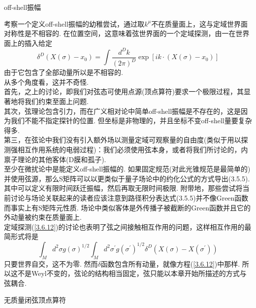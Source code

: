 \centerline{\Large off-shell振幅}
考察一个定义off-shell振幅的幼稚尝试，通过取$k^\mu$不在质量面上，这与定域世界面对称性是不相容的. 在位置空间，这意味着弦世界面的一个定域探测，由一在世界面上的插入给定
\begin{equation}\label{3.6.12}
\delta^{D}\left(X(\sigma)-x_{0}\right)=\int \frac{d^{D} k}{(2 \pi)^{D}} \exp \left[i k \cdot\left(X(\sigma)-x_{0}\right)\right]
\end{equation}
由于它包含了全部动量所以是不相容的.\\
从多个角度看，这并不奇怪. \\
首先，之上的讨论，即我们对弦态可使用点源(顶点算符)要求一个极限过程，其显著地将我们约束至面上问题. \\
其次，弦理论包含引力，而在广义相对论中简单off-shell振幅是不存在的，这是因为我们不能不指定探针的位置. 但坐标是非物理的，并且坐标不变off-shell量要复杂得多.\\
第三，在弦论中我们没有引入额外场以测量定域可观察量的自由度(类似于用以探测强相互作用系统的电弱过程)：我们必须使用弦本身，或者将我们所讨论的，内禀子理论的其他客体(D膜和孤子).\\
至少在微扰论中是能定义off-shell振幅的. 如果固定规范(对此光锥规范是最简单的)并使用弦源，那么S矩阵可以以更类似于量子场论中的约化公式的方式导出(3.5.5). 其中可以定义有限时间跃迁振幅，然后再取无限时间极限. 附带地，那些尝试将当前讨论与场论关联起来的读者应该注意到路径积分表达式(3.5.5)并不像Green函数而事实上有S矩阵元性质. 场论中类似客体是外传播子被截断的Green函数并且它的外动量被约束在质量面上.\\
定域探测(\ref{3.6.12})的讨论也表明了弦之间接触相互作用的问题，这样相互作用的最简形式将是
\begin{equation}
\int_{M} d^{2} \sigma g(\sigma)^{1 / 2} \int_{M} d^{2} \sigma^{\prime} g\left(\sigma^{\prime}\right)^{1 / 2} \delta^{D}\left(X(\sigma)-X\left(\sigma^{\prime}\right)\right)
\end{equation}
只要世界自交，这不为零. 然而$\delta$函数包含所有动量，就像方程(\ref{3.6.12})中那样. 所以这不是Weyl不变的，弦论的结构相当固定，弦只能以本章开始所描述的方式与弦耦合.\\

\centerline{\Large 无质量闭弦顶点算符}

